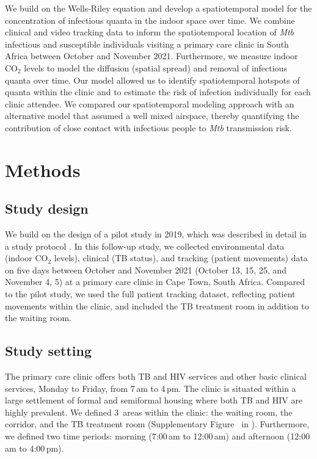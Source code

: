 \documentclass[fleqn,11pt]{wlscirep}
\begin{document}
We build on the Wells-Riley equation and develop a spatiotemporal model for the concentration of infectious quanta in the indoor space over time. We combine clinical and video tracking data to inform the spatiotemporal location of \emph{Mtb} infectious and susceptible individuals visiting a primary care clinic in South Africa between October and November 2021. Furthermore, we measure indoor CO$_2$ levels to model the diffusion (\ie spatial spread) and removal of infectious quanta over time. Our model allowed us to identify spatiotemporal hotspots of quanta within the clinic and to estimate the risk of infection individually for each clinic attendee. We compared our spatiotemporal modeling approach with an alternative model that assumed a well mixed airspace, thereby quantifying the contribution of close contact with infectious people to \emph{Mtb} transmission risk. 

\newpage

\section{Methods}

\subsection{Study design}

We build on the design of a pilot study in 2019\cite{Zurcher2022JID}, which was described in detail in a study protocol \cite{Zurcher2020BMJ}. In this follow-up study, we collected environmental data (indoor CO$_2$ levels), clinical (TB status), and tracking (patient movements) data on five days between October and November 2021 (October 13, 15, 25, and November 4, 5) at a primary care clinic in Cape Town, South Africa. Compared to the pilot study, we used the full patient tracking dataset, reflecting patient movements within the clinic, and included the TB treatment room in addition to the waiting room.

\subsection{Study setting}

The primary care clinic offers both TB and HIV services and other basic clinical services, Monday to Friday, from 7\,am to 4\,pm. The clinic is situated within a large settlement of formal and semiformal housing where both TB and HIV are highly prevalent\cite{Wood2007AMJRCCD,Middelkoop2011JAIDS}. We defined 3~areas within the clinic: the waiting room, the corridor, and the TB treatment room (Supplementary Figure~ in \supp). Furthermore, we defined two time periods: morning (7:00\,am to 12:00\,am) and afternoon (12:00\,am to 4:00\,pm). 
\end{document}
